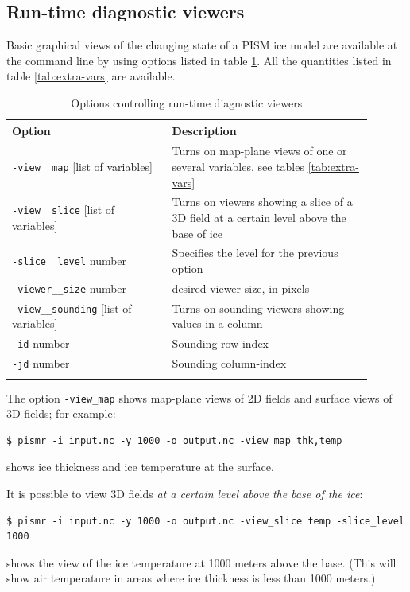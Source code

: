 \documentclass[11pt,final]{amsart}
\newcommand{\und}{\_\!\_}
\newcommand{\pismoptionindex}[1]{\index{options for PISM (and PETSc)!\texttt{-#1}}}
\newcommand{\intextoption}[1]{\texttt{-#1}\pismoptionindex{#1}}
\begin{document}
\subsection{Run-time diagnostic viewers}
\label{sec:diagnostic-viewers}
Basic graphical views of the changing state of a PISM ice model are available at the command line by using options listed in table \ref{tab:diag-viewers}.
All the quantities listed in table \ref{tab:extra-vars} are available.
\begin{table}[ht]
  \caption{Options controlling run-time diagnostic viewers}
  \centering
  \begin{tabular}{p{0.4\linewidth}p{0.5\linewidth}}\hline
    \small
   \textbf{Option} & \textbf{Description}\\
    \hline
    \intextoption{view\und map} [list of variables] & Turns on map-plane views of one or several variables, see tables \ref{tab:extra-vars}  \\
    \intextoption{view\und slice} [list of variables] & Turns on viewers showing a slice of a 3D field at a certain level above the base of ice\\
    \intextoption{slice\und level} number& Specifies the level for the previous option\\
    \intextoption{viewer\und size} number & desired viewer size, in pixels\\
    \intextoption{view\und sounding} [list of variables] &Turns on sounding viewers showing values in a column\\
    \intextoption{id} number & Sounding row-index\\
    \intextoption{jd} number & Sounding column-index\\
    \hline
  \normalsize
  \end{tabular}
 \label{tab:diag-viewers}
\end{table}
The option \verb|-view_map| shows map-plane views of 2D fields and surface views of 3D fields; for example:
\begin{verbatim}
$ pismr -i input.nc -y 1000 -o output.nc -view_map thk,temp 
\end{verbatim}%
shows ice thickness and ice temperature at the surface.

It is possible to view 3D fields \emph{at a certain level above the base of the ice}:
\begin{verbatim}
$ pismr -i input.nc -y 1000 -o output.nc -view_slice temp -slice_level 1000
\end{verbatim}%
shows the view of the ice temperature at 1000 meters above the base. (This will show air temperature in areas where ice thickness is less than 1000 meters.)
\end{document}

